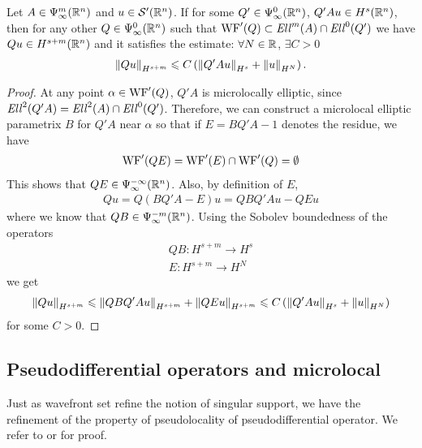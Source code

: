 \documentclass[12pt]{article}
\begin{document}
\begin{fcor} \label{cor : microlocal elliptic estimate}
    Let $A \in \Psi^{m}_{\infty}(\R^n)$ and $u \in \sch'(\R^n)$. If for some $Q' \in \Psi^{0}_{\infty}(\R^n)$, $Q'Au \in H^{s}(\R^n)$, then for any other $Q \in \Psi^{0}_{\infty}(\R^n)$ such that $\WF'(Q) \subset \Ell^m(A) \cap \Ell^0(Q')$ we have $Qu \in H^{s + m}(\R^n)$ and it satisfies the estimate: $\forall N \in \R$, $\exists C > 0$ 
    \begin{align*}
    \norm[Qu]_{H^{s +m}} \leq C \brac{\norm[Q'Au]_{H^s} + \norm[u]_{H^N}}. 
    \end{align*}
\end{fcor}
\begin{proof}
    At any point $\alpha \in \WF'(Q)$, $Q'A$ is microlocally elliptic, since $\Ell^2(Q'A) = \Ell^2(A) \cap \Ell^0(Q')$. Therefore, we can construct a microlocal elliptic parametrix $B$ for $Q'A$ near $\alpha$ so that if  $E = BQ'A - 1$ denotes the residue, we have 
    \begin{align*}
    \WF'(QE) = \WF'(E) \cap \WF'(Q) = \emptyset 
    \end{align*}
    This shows that $QE \in \Psi^{-\infty}_{\infty}(\R^n)$. Also, by definition of $E$, 
    \begin{align*}
    Qu = Q (BQ'A - E) u = QBQ'A u - QEu 
    \end{align*}
    where we know that $QB \in \Psi^{-m}_{\infty}(\R^n)$. Using the Sobolev boundedness of the operators
    \begin{align*}
    QB : H^{s + m} \to H^{s}\\
    E : H^{s + m} \to H^N
    \end{align*}
    we get
    \begin{align*}
    \norm[Qu]_{H^{s + m}} \leq \norm[QBQ'Au]_{H^{s + m}} + \norm[QEu]_{H^{s + m}} \leq C \brac{\norm[Q'Au]_{H^s} + \norm[u]_{H^N}}
    \end{align*}
    for some $C > 0$. 
    
\end{proof}

\subsection{Pseudodifferential operators and microlocal}
Just as wavefront set refine the notion of singular support, we have the refinement of the property of pseudolocality of pseudodifferential operator. We refer to \cite{Vasy2015-oo} or \cite{rbm_intro_microlocal} for proof. 
\end{document}
